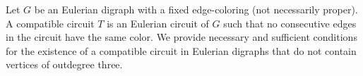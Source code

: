 \endtitle
Let $G$ be an Eulerian digraph with a fixed edge-coloring (not necessarily proper).  A compatible circuit $T$ is an Eulerian circuit of $G$ such that no consecutive edges in the circuit have the same color.  We provide necessary and sufficient conditions for the existence of a compatible circuit in Eulerian digraphs that do not contain vertices of outdegree three.